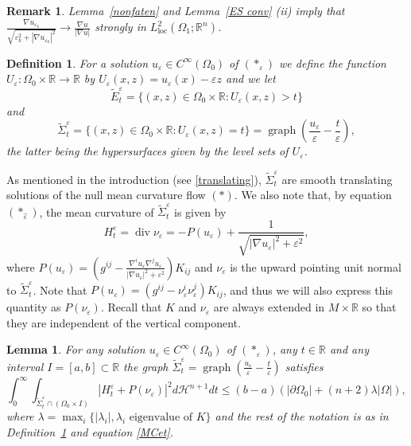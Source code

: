 \documentclass[11pt]{amsart}
\newtheorem{Lemma}[Theorem]{Lemma}
\newtheorem{Remark}[Theorem]{Remark}
\newtheorem{Definition}[Theorem]{Definition}
\renewcommand{\epsilon}{\varepsilon}
\DeclareMathOperator{\dvg}{div} \DeclareMathOperator{\spt}{spt}
\DeclareMathOperator{\graph}{graph} \DeclareMathOperator{\closure}{Closure}
\def\R{\mathbb{R}}
\def\e{\epsilon}
\def\l{\lambda}
\def\H{\mathcal{H}}
\def\wt{\widetilde}
\def\loc{\text{loc}}
\begin{document}
\begin{Remark}\label{ES conv2} Lemma~\ref{nonfaten} and Lemma~\ref{ES conv} (ii) imply that
$\frac{\nabla u_{\e_k}}{\sqrt{\e_k^2+|\nabla u_{\e_k}|^2}}\to\frac {\nabla u}{|\nabla u|}$ strongly in $L^2_\loc(\Omega_1;\R^n)$.
\end{Remark}


\begin{Definition}\label{Ue}
For a solution $u_{\e}\in C^\infty(\Omega_0)$ of $(*_{\e})$ we define  the function $U_{\e}:\Omega_0\times\R\to \R$ by $U_{\e}(x,z)=u_{\e}(x)-\e z$ and we let
\[\wt E_t^\e=\{(x,z)\in \Omega_0\times\R: U_{\e}(x,z)>t\}\]
and
\[\wt\Sigma^{\e}_t=\{(x,z)\in \Omega_0\times \R:U_{\e}(x,z)=t\}=\graph\left(\frac{u_{\e}}{\e}-\frac{t}{\e}\right),\]
the latter being the hypersurfaces given by the level sets of $U_\e$. 
\end{Definition}
As mentioned in the introduction (see \eqref{translating}), $\wt\Sigma^{\e}_t$ are smooth translating solutions of  the  null mean curvature flow $(*)$. We also note that, by equation $(*_{\hat \e})$,  the mean curvature of $\wt\Sigma^{\e}_t$ is given by
\begin{equation}\label{MCet}
H^{\e}_t=\dvg\nu_\e=-P(u_{\e})+\frac{1}{\sqrt{|\nabla u_{\e}|^2+{\e}^2}},
\end{equation}
where   $P(u_{\e})=\left(g^{ij}-\frac{\nabla^i u_{\e}\nabla^j u_{\e}}{|\nabla u_{\e}|^2+{\e}^2}\right) K_{ij}$ and $\nu_{\e}$ is the upward pointing unit normal to $\wt\Sigma^{\e}_t$. Note that $P(u_{\e})=\left(g^{ij}-\nu^i_{\e}\nu^j_{\e}\right) K_{ij}$, and thus we will also express this quantity as $P(\nu_{\e})$. Recall that $K$ and $\nu_\e$ are always extended in $M\times\R$ so that they are independent of the vertical component.




\begin{Lemma}\label{H+Pk} For any solution  $u_{\e}\in C^\infty(\Omega_0)$ of $(*_{\e})$, any $t\in \R$  and any interval $I=[a,b]\subset \R$ the graph  $\wt\Sigma^{\e}_t=\graph\left(\frac{u_{\e}}{\e}-\frac{t}{\e}\right)$ satisfies 
\[\int_{0}^{\infty}\int_{\wt\Sigma^{\e}_t\cap (\Omega_0\times I)}|H^\e_t+ P(\nu_\e)|^2d\H^{n+1}dt\le (b-a)\left(|\partial\Omega_0|+(n+2)\lambda|\Omega|
\right), \]
where  $ \lambda=\max_i\{|\l_i|, \l_i\text{  eigenvalue of  } K\}$ and the rest of the notation is as in Definition~\ref{Ue} and equation  \eqref{MCet}. 
\end{Lemma}
\end{document}
